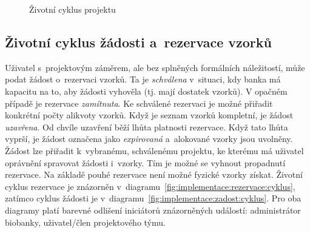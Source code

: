 \documentclass[11pt,draft,oneside]{fithesis2}
\begin{document}
\begin{figure}[hbtp]
\begin{center}
\caption{Životní cyklus projektu}
\label{fig:implementace:projekt:cyklus}
\end{center}
\end{figure}

\subsection{Životní cyklus žádosti a~rezervace vzorků}
Uživatel s~projektovým záměrem, ale bez splněných formálních náležitostí, může podat žádost o~rezervaci vzorků. Ta je \textit{schválena} v~situaci, kdy banka má kapacitu na to, aby žádosti vyhověla (tj. mají dostatek vzorků). V opačném případě je rezervace \textit{zamítnuta}. Ke schválené rezervaci je možné přiřadit konkrétní počty alikvoty vzorků. Když je seznam vzorků kompletní, je žádost \textit{uzavřena}. Od chvíle uzavření běží lhůta platnosti rezervace. Když tato lhůta vyprší, je žádost označena jako \textit{expirovaná} a~alokované vzorky jsou uvolněny.
Žádost lze přiřadit k~vybranému, schválenému projektu, ke kterému má uživatel oprávnění spravovat žádosti i~vzorky. Tím je možné se vyhnout propadnutí rezervace. 
Na základě pouhé rezervace není možné fyzické vzorky získat. Životní cyklus rezervace je znázorněn v~diagramu~\ref{fig:implementace:rezervace:cyklus}, zatímco cyklus žádosti je v~diagramu~\ref{fig:implementace:zadost:cyklus}. Pro oba diagramy platí barevné odlišení iniciátorů znázorněných událostí: {\color{palatinatepurple}administrátor biobanky}, {\color{cyan}uživatel}/{\color{cyan}člen projektového týmu}. 
\end{document}
